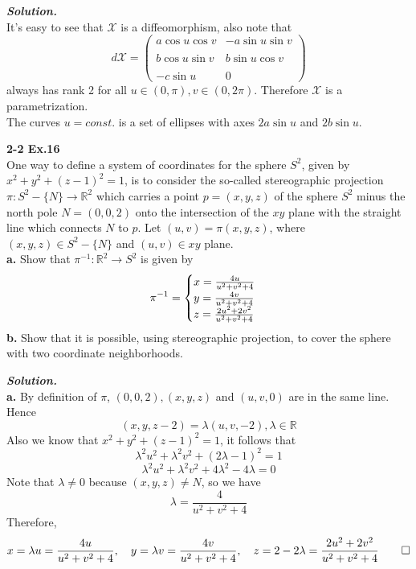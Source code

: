 \documentclass{article}
\begin{document}
\par
\textbf{\textit{Solution.}}\\
It's easy to see that $\mathcal{X}$ is a diffeomorphism, also note that
$$
    d\mathcal{X} = 
    \left(
        \begin{array}{cc}
            a \cos u \cos v & -a \sin u \sin v\\\\
            b \cos u \sin v & b \sin u \cos v\\\\
            -c \sin u & 0
        \end{array}
    \right)
$$
always has rank 2 for all $u \in (0, \pi), v \in (0, 2 \pi)$. Therefore $\mathcal{X}$ is
a parametrization.\\
The curves $u = const.$ is a set of ellipses with axes $2a \sin u$ and $2b \sin u$. \qedsymbol

\par
\textbf{2-2 Ex.16}\\
One way to define a system of coordinates for the sphere $S^2$, given by $x^2 + y^2 + (z-1)^2 = 1$,
is to consider the so-called stereographic projection $\pi: S^2 - \{N\} \to \mathbb{R}^2$ which
carries a point $p = (x,y,z)$ of the sphere $S^2$ minus the north pole $N = (0,0,2)$
onto the intersection of the $xy$ plane with the straight line which connects $N$ to $p$.
Let $(u,v) = \pi(x,y,z)$, where $(x,y,z) \in S^2 - \{N\}$ and $(u,v) \in xy$ plane.\\
\textbf{a. }Show that $\pi^{-1}: \mathbb{R}^2 \to S^2$ is given by 
$$
    \pi^{-1} = 
    \begin{cases}
        x = \frac{4u}{u^2+v^2+4}\cr
        y = \frac{4v}{u^2+v^2+4}\cr
        z = \frac{2u^2+2v^2}{u^2+v^2+4}
    \end{cases}
$$
\textbf{b. }Show that it is possible, using stereographic projection, to cover the sphere with
two coordinate neighborhoods.

\par
\textbf{\textit{Solution.}}\\
\textbf{a. }By definition of $\pi$, $(0,0,2), (x,y,z)$ and $(u,v,0)$ are in the same line. Hence
$$
    (x,y,z-2) = \lambda (u,v,-2), \lambda \in \mathbb{R}
$$
Also we know that $x^2 + y^2 + (z-1)^2 = 1$, it follows that
$$
    \lambda^2 u^2 + \lambda^2 v^2 + (2\lambda - 1)^2 = 1
$$
$$
    \lambda^2 u^2 + \lambda^2 v^2 + 4\lambda^2 - 4\lambda = 0
$$
Note that $\lambda \neq 0$ because $(x,y,z) \neq N$, so we have
$$
    \lambda = \frac{4}{u^2+v^2+4}
$$
Therefore,
$$
    x = \lambda u = \frac{4u}{u^2+v^2+4}, \quad y = \lambda v = \frac{4v}{u^2+v^2+4}, \quad z = 2-2\lambda = \frac{2u^2+2v^2}{u^2+v^2+4} \qed
$$
\end{document}
